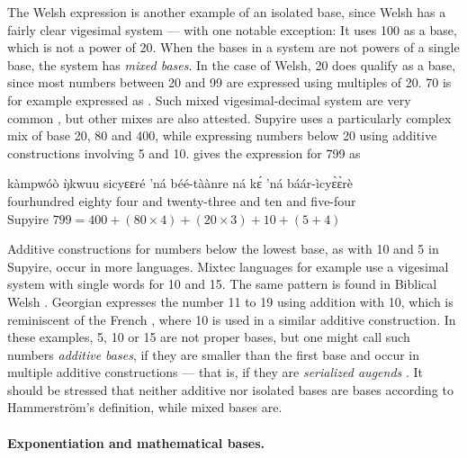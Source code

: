 \documentclass{../src/bcthesispart}
\begin{document}
The Welsh expression  is another example of an isolated base, since Welsh has a fairly clear vigesimal system — with one notable exception:
It uses 100 as a base, which is not a power of 20. 
When the bases in a system are not powers of a single base, the system has \emph{mixed bases}. 
In the case of Welsh, 20 does qualify as a base, since most numbers between 20 and 99 are expressed using multiples of 20. 
70 is for example expressed as . 
Such mixed vigesimal-decimal system are very common \parencite{Comrie2013}, but other mixes are also attested. 
Supyire uses a particularly complex mix of base 20, 80 and 400, while expressing numbers below 20 using additive constructions involving 5 and 10. 
\textcite{Comrie2011} gives the expression for 799 as
\begin{exe}
	\ex\gll%
	kàmpwóò ŋ̀kwuu sicyɛɛré 'ná béé-tàànre ná kɛ́ 'ná báár-ìcyɛ̀ɛ̀rè\\
	fourhundred eighty four and twenty-three and ten and five-four\\
	\hfill Supyire
	\glt $799=400 + (80 \times 4) + (20 \times 3) + 10 + (5 + 4)$
\end{exe}




Additive constructions for numbers below the lowest base, as with 10 and 5 in Supyire, occur in more languages. 
Mixtec languages for example use a vigesimal system with single words for 10 and 15.
The same pattern is found in Biblical Welsh \parencite{Hurford1975}.
Georgian expresses the number 11 to 19 using addition with 10, which is reminiscent of the French , where 10 is used in a similar additive construction. 
In these examples, 5, 10 or 15 are not proper bases, but one might call such numbers \emph{additive bases}, if they are smaller than the first base and occur in multiple additive constructions — that is, if they are \emph{serialized augends} \parencite{Greenberg1978}.
It should be stressed that neither additive nor isolated bases are bases according to Hammerström’s definition, while mixed bases are.




\paragraph{Exponentiation and mathematical bases.}
\end{document}

